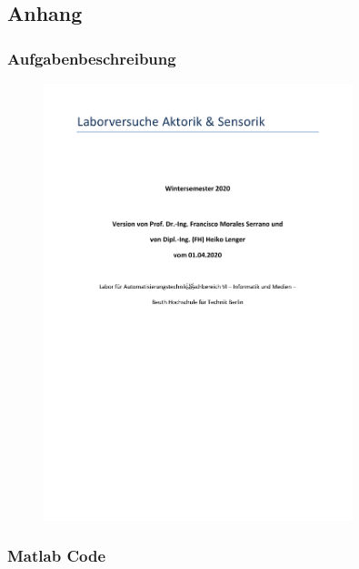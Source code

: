 \subsection{Anhang}

\subsubsection{Aufgabenbeschreibung}
\begin{figure}[H]
    \centering
    \includegraphics[page=7, width=0.8\textwidth]{../Aufgabenstellung.pdf}
    \label{fig:Aufgabenstellung Labor 3}
\end{figure}


\subsubsection{Matlab Code}


